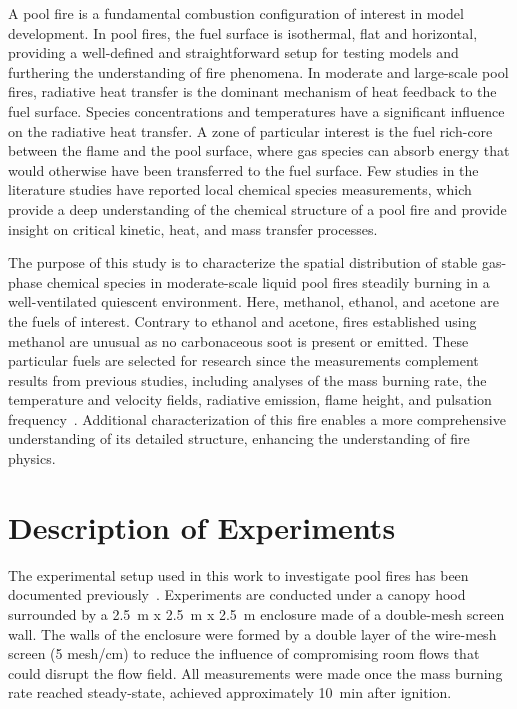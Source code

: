 \documentclass[12pt]{article}
\begin{document}
A pool fire is a fundamental combustion configuration of interest in model development. In pool fires, the fuel surface is isothermal, flat and horizontal, providing a well-defined and straightforward setup for testing models and furthering the understanding of fire phenomena. In moderate and large-scale pool fires, radiative heat transfer is the dominant mechanism of heat feedback to the fuel surface. Species concentrations and temperatures have a significant influence on the radiative heat transfer. A zone of particular interest is the fuel rich-core between the flame and the pool surface, where gas species can absorb energy that would otherwise have been transferred to the fuel surface. Few studies in the literature studies have reported local chemical species measurements, which provide a deep understanding of the chemical structure of a pool fire and provide insight on critical kinetic, heat, and mass transfer processes.

The purpose of this study is to characterize the spatial distribution of stable gas-phase chemical species in moderate-scale liquid pool fires steadily burning in a well-ventilated quiescent environment. Here, methanol, ethanol, and acetone are the fuels of interest. Contrary to ethanol and acetone, fires established using methanol are unusual as no carbonaceous soot is present or emitted. These particular fuels are selected for research since the measurements complement results from previous studies, including analyses of the mass burning rate, the temperature and velocity fields, radiative emission, flame height, and pulsation frequency~\cite{Fisher1987,Hamins2016}. Additional characterization of this fire enables a more comprehensive understanding of its detailed structure, enhancing the understanding of fire physics.

\section{Description of Experiments}
\label{sec:Experiments}

The experimental setup used in this work to investigate pool fires has been documented previously~\cite{Hamins2016,Hamins1994,Hamins1991,Hamins1996,Lock2008}. Experiments are conducted under a canopy hood surrounded by a \SI{2.5}{m} x \SI{2.5}{m} x \SI{2.5}{m} enclosure made of a double-mesh screen wall. The walls of the enclosure were formed by a double layer of the wire-mesh screen (5 mesh/cm) to reduce the influence of compromising room flows that could disrupt the flow field. All measurements were made once the mass burning rate reached steady-state, achieved approximately \SI{10}{min} after ignition.
\end{document}
